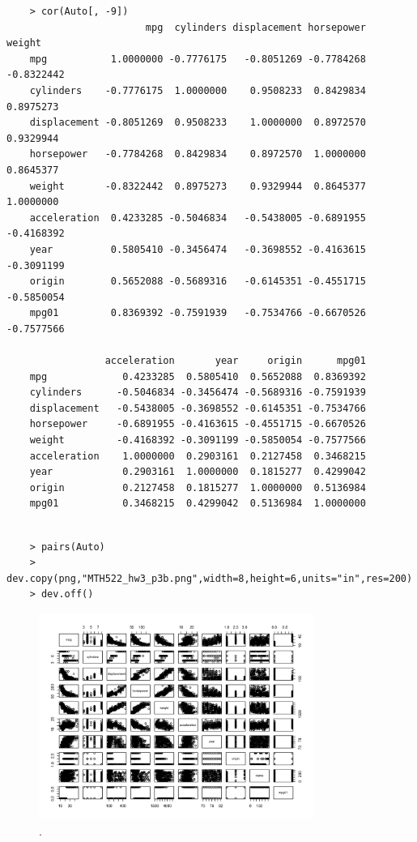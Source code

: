 \documentclass{article}
\begin{document}
\begin{program}
	\begin{verbatim}
	> cor(Auto[, -9])
	                    mpg  cylinders displacement horsepower     weight
	mpg           1.0000000 -0.7776175   -0.8051269 -0.7784268 -0.8322442
	cylinders    -0.7776175  1.0000000    0.9508233  0.8429834  0.8975273
	displacement -0.8051269  0.9508233    1.0000000  0.8972570  0.9329944
	horsepower   -0.7784268  0.8429834    0.8972570  1.0000000  0.8645377
	weight       -0.8322442  0.8975273    0.9329944  0.8645377  1.0000000
	acceleration  0.4233285 -0.5046834   -0.5438005 -0.6891955 -0.4168392
	year          0.5805410 -0.3456474   -0.3698552 -0.4163615 -0.3091199
	origin        0.5652088 -0.5689316   -0.6145351 -0.4551715 -0.5850054
	mpg01         0.8369392 -0.7591939   -0.7534766 -0.6670526 -0.7577566
	
	             acceleration       year     origin      mpg01
	mpg             0.4233285  0.5805410  0.5652088  0.8369392
	cylinders      -0.5046834 -0.3456474 -0.5689316 -0.7591939
	displacement   -0.5438005 -0.3698552 -0.6145351 -0.7534766
	horsepower     -0.6891955 -0.4163615 -0.4551715 -0.6670526
	weight         -0.4168392 -0.3091199 -0.5850054 -0.7577566
	acceleration    1.0000000  0.2903161  0.2127458  0.3468215
	year            0.2903161  1.0000000  0.1815277  0.4299042
	origin          0.2127458  0.1815277  1.0000000  0.5136984
	mpg01           0.3468215  0.4299042  0.5136984  1.0000000
	
	\end{verbatim}
\end{program}

\newpage

\begin{program}
	\begin{verbatim}	
	> pairs(Auto)
	> dev.copy(png,"MTH522_hw3_p3b.png",width=8,height=6,units="in",res=200)
	> dev.off()
	\end{verbatim}
	\caption{The R code generate Figure.\ \ref{fig:MTH522_hw3_p3b}.}
\end{program}
\begin{figure}[htb]
	\begin{center}
		\includegraphics[width=0.8\textwidth]{MTH522_hw3_p3b.png}
	\end{center}
	\caption{.}
	\label{fig:MTH522_hw3_p3b}
\end{figure}
\end{document}

